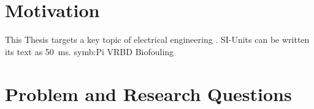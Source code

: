 \documentclass[class=scrbook, crop=false]{standalone}
\begin{document}
\section{Motivation}
\label{Section::Motivation}
    This Thesis targets a key topic of electrical engineering \cite{Piezoelectirc_Sensors_and_Actors}. SI-Units can be written its text as \SI{50}{\ms}. \gls{symb:Pi} \gls{VRBD} \gls{Biofouling}

\section{Problem and Research Questions}
\label{Section::Problem_and_Research_Questions}
    \Blindtext

\ifstandalone
    \printnoidxglossary[type=\acronymtype]
    \printbibliography[heading=bibintoc]
\fi
\end{document}
